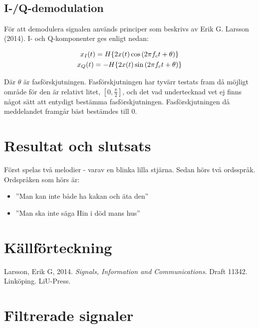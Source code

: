\documentclass[10pt]{article}
\begin{document}
\newpage
~\\
\newpage
\subsection{I-/Q-demodulation}

För att demodulera signalen används principer som beskrivs av Erik G. Larsson (2014). I- och Q-komponenter ges enligt nedan: 

\begin{gather}
x_{I}(t) = \Large{H}\{2x(t)\cos{(2{\pi}f_{c}t + \theta)}\} \\
x_{Q}(t) = -\Large{H}\{2x(t)\sin{(2{\pi}f_{c}t + \theta)}\}
\label{equ:iq}
\end{gather}

Där $\theta$ är fasförskjutningen. Fasförskjutningen har tyvärr testats fram då möjligt område för den är relativt litet, $[0,\frac{\pi}{2}]$, och det vad undertecknad vet ej finns något sätt att entydigt bestämma fasförskjutningen. Fasförskjutningen då meddelandet framgår bäst bestämdes till $0$.



\newpage
\section{Resultat och slutsats}

Först spelas två melodier - varav en blinka lilla stjärna. Sedan hörs två ordsspråk. Ordspråken som hörs är: 

\begin{itemize}
	\item ''Man kan inte både ha kakan och äta den''
	\item ''Man ska inte säga Hin i död mans hus''
\end{itemize}


\section{Källförteckning}

Larsson, Erik G, 2014. \textit{Signals, Information and Communications}. Draft 11342. Linköping. LiU-Press.


\appendix
\pagestyle{empty}
\section{Filtrerade signaler}
\end{document}

